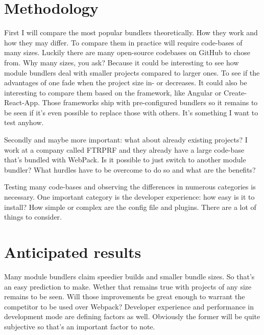 \section{Methodology}
\label{sec:methodologie}

First I will compare the most popular bundlers theoretically. How they work and how they may differ. 
To compare them in practice will require code-bases of many sizes. Luckily there are many open-source codebases on GitHub to chose from. Why many sizes, you ask? Because it could be interesting to see how module bundlers deal with smaller projects compared to larger ones. To see if the advantages of one fade when the project size in- or decreases. It could also be interesting to compare them based on the framework, like Angular or Create-React-App. Those frameworks ship with pre-configured bundlers so it remains to be seen if it's even possible to replace those with others. It's something I want to test anyhow. 

Secondly and maybe more important: what about already existing projects? I work at a company called FTRPRF and they already have a large code-base that's bundled with WebPack. Is it possible to just switch to another module bundler? What hurdles have to be overcome to do so and what are the benefits? 

Testing many code-bases and observing the differences in numerous categories is necessary. One important category is the developer experience: how easy is it to install? How simple or complex are the config file and plugins. There are a lot of things to consider. 

\section{Anticipated results}
\label{sec:verwachte_resultaten}

Many module bundlers claim speedier builds and smaller bundle sizes. So that's an easy prediction to make. Wether that remains true with projects of any size remains to be seen. Will those improvements be great enough to warrant the competitor to be used over Webpack? Developer experience and performance in development mode are defining factors as well. Obviously the former will be quite subjective so that's an important factor to note.

